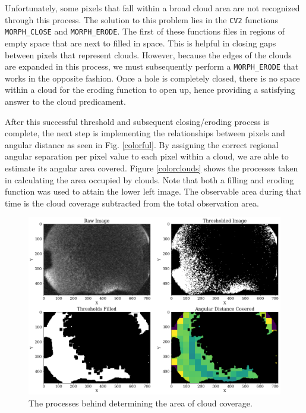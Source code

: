 Unfortunately, some pixels that fall within a broad cloud area are not recognized through this process.
The solution to this problem lies in the \texttt{CV2} functions \texttt{MORPH\_CLOSE} and \texttt{MORPH\_ERODE}.
The first of these functions files in regions of empty space that are next to filled in space.
This is helpful in closing gaps between pixels that represent clouds.
However, because the edges of the clouds are expanded in this process, we must subsequently perform a \texttt{MORPH\_ERODE} that works in the opposite fashion.
Once a hole is completely closed, there is no space within a cloud for the eroding function to open up, hence providing a satisfying answer to the cloud predicament.

After this successful threshold and subsequent closing/eroding process is complete, the next step is implementing the relationships between pixels and angular distance as seen in Fig. \ref{colorful}.
By assigning the correct regional angular separation per pixel value to each pixel within a cloud, we are able to estimate its angular area covered.
Figure \ref{colorclouds} shows the processes taken in calculating the area occupied by clouds.
Note that both a filling and eroding function was used to attain the lower left image.
The observable area during that time is the cloud coverage subtracted from the total observation area.


\begin{figure}[ht!]
  \centering
  \includegraphics[scale=0.4]{images/Cloud_analysis.png}
  \caption{The processes behind determining the area of cloud coverage.}
  \label{colorcloud}
\end{figure}




